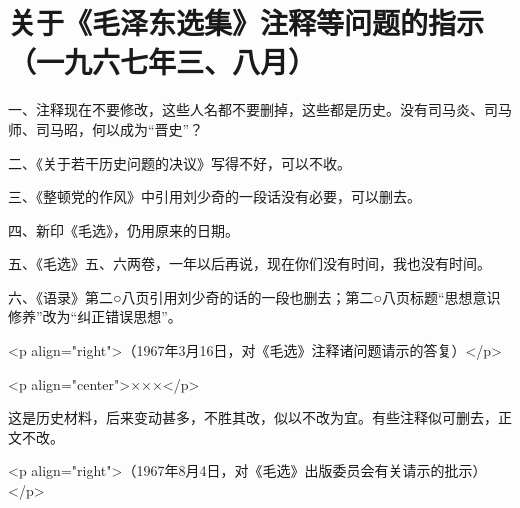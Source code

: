 \section[关于《毛泽东选集》注释等问题的指示（一九六七年三、八月）]{关于《毛泽东选集》注释等问题的指示（一九六七年三、八月）}


一、注释现在不要修改，这些人名都不要删掉，这些都是历史。没有司马炎、司马师、司马昭，何以成为“晋史”？

二、《关于若干历史问题的决议》写得不好，可以不收。

三、《整顿党的作风》中引用刘少奇的一段话没有必要，可以删去。

四、新印《毛选》，仍用原来的日期。

五、《毛选》五、六两卷，一年以后再说，现在你们没有时间，我也没有时间。

六、《语录》第二○八页引用刘少奇的话的一段也删去；第二○八页标题“思想意识修养”改为“纠正错误思想”。

<p align="right">（1967年3月16日，对《毛选》注释诸问题请示的答复）</p>

<p align="center">×××</p>

这是历史材料，后来变动甚多，不胜其改，似以不改为宜。有些注释似可删去，正文不改。

<p align="right">（1967年8月4日，对《毛选》出版委员会有关请示的批示）</p>


